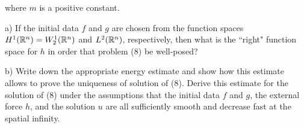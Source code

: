\documentclass{article}
\begin{document}
\begin{description}
where $m$ is a positive constant.

\item[\quad] a)
If the initial data $f$ and $g$ are chosen from the function spaces
$H^1(\Bbb R^n) = W^1_2(\Bbb R^n)$ and $L^2(\Bbb R^n)$, respectively,
then what is the ``right" function space for $h$ in order that problem
(8) be well-posed?

\item[\quad] b)
Write down the appropriate energy estimate and show how this estimate allows
to prove the uniqueness of solution of (8). Derive this estimate for the
solution of (8) under the assumptions that the initial data $f$ and $g$,
the external force $h$, and the solution $u$ are all sufficiently smooth
and decrease fast at the spatial infinity.



\end{description}    
\end{document}
